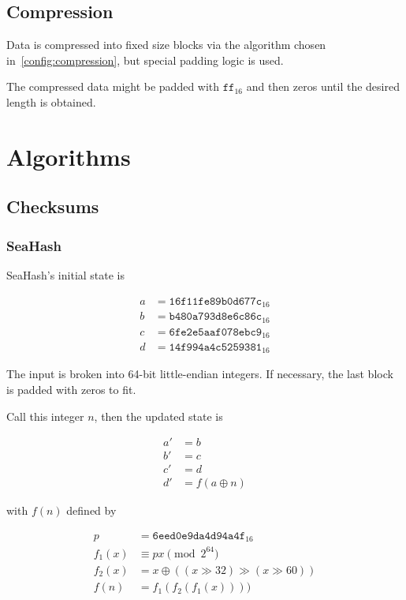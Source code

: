 \documentclass[11pt,a4paper]{report}
\begin{document}
    \section{Compression}
    \label{cluster:compression}
        Data is compressed into fixed size blocks via the algorithm chosen
        in~\ref{config:compression}, but special padding logic is used.

        The compressed data might be padded with $\texttt{ff}_{16}$ and then
        zeros until the desired length is obtained.

    \chapter{Algorithms}

    \section{Checksums}
        \subsection{SeaHash}
        \label{algorithm:seahash}
        SeaHash's initial state is

        \begin{align*}
            a &= \texttt{16f11fe89b0d677c}_{16} \\
            b &= \texttt{b480a793d8e6c86c}_{16} \\
            c &= \texttt{6fe2e5aaf078ebc9}_{16} \\
            d &= \texttt{14f994a4c5259381}_{16}
        \end{align*}

        The input is broken into 64-bit little-endian integers. If necessary,
        the last block is padded with zeros to fit.

        Call this integer $n$, then the updated state is

        \begin{align*}
            a' &= b \\
            b' &= c \\
            c' &= d \\
            d' &= f(a \oplus n)
        \end{align*}

        with $f(n)$ defined by

        \begin{align*}
            p      &=      \texttt{6eed0e9da4d94a4f}_{16} \\
            f_1(x) &\equiv px \pmod{2^{64}} \\
            f_2(x) &=      x \oplus ((x \gg 32) \gg (x \gg 60)) \\
            f(n)   &=      f_1(f_2(f_1(x))))
        \end{align*}
\end{document}
